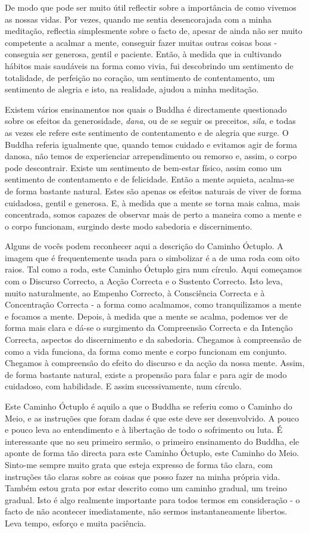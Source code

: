 De modo que pode ser muito útil reflectir sobre a importância de como
vivemos as nossas vidas. Por vezes, quando me sentia desencorajada com a
minha meditação, reflectia simplesmente sobre o facto de, apesar de
ainda não ser muito competente a acalmar a mente, conseguir fazer muitas
outras coisas boas - conseguia ser generosa, gentil e paciente. Então, à
medida que ia cultivando hábitos mais saudáveis na forma como vivia, fui
descobrindo um sentimento de totalidade, de perfeição no coração, um
sentimento de contentamento, um sentimento de alegria e isto, na
realidade, ajudou a minha meditação.

Existem vários ensinamentos nos quais o Buddha é directamente
questionado sobre os efeitos da generosidade, \emph{dana}, ou de se
seguir os preceitos, \emph{sila}, e todas as vezes ele refere este
sentimento de contentamento e de alegria que surge. O Buddha referia
igualmente que, quando temos cuidado e evitamos agir de forma danosa,
não temos de experienciar arrependimento ou remorso e, assim, o corpo
pode descontrair. Existe um sentimento de bem-estar físico, assim como
um sentimento de contentamento e de felicidade. Então a mente aquieta,
acalma-se de forma bastante natural. Estes são apenas os efeitos
naturais de viver de forma cuidadosa, gentil e generosa. E, à medida que
a mente se torna mais calma, mais concentrada, somos capazes de observar
mais de perto a maneira como a mente e o corpo funcionam, surgindo deste
modo sabedoria e discernimento.

Alguns de vocês podem reconhecer aqui a descrição do Caminho Óctuplo. A
imagem que é frequentemente usada para o simbolizar é a de uma roda com
oito raios. Tal como a roda, este Caminho Óctuplo gira num círculo. Aqui
começamos com o Discurso Correcto, a Acção Correcta e o Sustento
Correcto. Isto leva, muito naturalmente, ao Empenho Correcto, à
Consciência Correcta e à Concentração Correcta - a forma como acalmamos,
como tranquilizamos a mente e focamos a mente. Depois, à medida que a
mente se acalma, podemos ver de forma mais clara e dá-se o surgimento da
Compreensão Correcta e da Intenção Correcta, aspectos do discernimento e
da sabedoria. Chegamos à compreensão de como a vida funciona, da forma
como mente e corpo funcionam em conjunto. Chegamos à compreensão do
efeito do discurso e da acção da nossa mente. Assim, de forma bastante
natural, existe a propensão para falar e para agir de modo cuidadoso,
com habilidade. E assim sucessivamente, num círculo.

Este Caminho Óctuplo é aquilo a que o Buddha se referiu como o Caminho
do Meio, e as instruções que foram dadas é que este deve ser
desenvolvido. A pouco e pouco leva ao entendimento e à libertação de
todo o sofrimento ou luta. É interessante que no seu primeiro sermão, o
primeiro ensinamento do Buddha, ele aponte de forma tão directa para
este Caminho Óctuplo, este Caminho do Meio. Sinto-me sempre muito grata
que esteja expresso de forma tão clara, com instruções tão claras sobre
as coisas que posso fazer na minha própria vida. Também estou grata por
estar descrito como um caminho gradual, um treino gradual. Isto é algo
realmente importante para todos termos em consideração - o facto de não
acontecer imediatamente, não sermos instantaneamente libertos. Leva
tempo, esforço e muita paciência.

